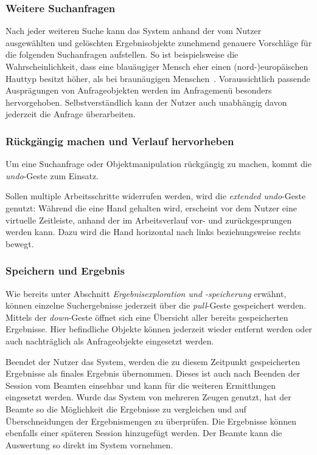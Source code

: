 \documentclass{sigchi-ext}
\begin{document}
\subsubsection{Weitere Suchanfragen}
Nach jeder weiteren Suche kann das System anhand der vom Nutzer
ausgewählten und gelöschten Ergebnisobjekte zunehmend genauere
Vorschläge für die folgenden Suchanfragen aufstellen. 
So ist beispielsweise die Wahrscheinlichkeit, dass eine blauäugiger Mensch eher einen
(nord-)europäischen Hauttyp besitzt höher, als bei braunäugigen
Menschen~\cite{eyecolor:article}. Voraussichtlich passende Ausprägungen von Anfrageobjekten werden im Anfragemenü besonders hervorgehoben. Selbstverständlich kann der Nutzer auch unabhängig davon jederzeit die Anfrage überarbeiten.

\subsubsection{Rückgängig machen und Verlauf hervorheben}
Um eine Suchanfrage oder Objektmanipulation rückgängig zu machen,
kommt die \textit{undo}-Geste zum Einsatz. 

Sollen multiple Arbeitsschritte
widerrufen werden, wird die \textit{extended undo}-Geste genutzt: 
Während die eine Hand gehalten wird, erscheint vor dem Nutzer eine virtuelle
Zeitleiste, anhand der im Arbeitsverlauf vor- und zurückgesprungen
werden kann. Dazu wird die Hand horizontal nach links beziehungsweise rechts
bewegt. 

\subsubsection{Speichern und Ergebnis}
Wie bereits unter Abschnitt \textit{Ergebnisexploration und -speicherung} erwähnt, können einzelne Suchergebnisse jederzeit über die \textit{pull}-Geste gespeichert werden. Mittels der \textit{down}-Geste öffnet sich eine Übersicht aller bereits gespeicherten Ergebnisse. Hier befindliche Objekte können jederzeit wieder entfernt werden oder auch nachträglich als Anfrageobjekte eingesetzt werden.

Beendet der Nutzer das System, werden die zu diesem Zeitpunkt gespeicherten Ergebnisse als finales Ergebnis übernommen. Dieses ist auch nach Beenden der Session vom Beamten einsehbar und kann für die weiteren Ermittlungen eingesetzt werden. Wurde das System von mehreren Zeugen genutzt, hat der Beamte so die Möglichkeit die Ergebnisse zu vergleichen und auf Überschneidungen der Ergebnismengen zu überprüfen. Die Ergebnisse können ebenfalls einer späteren Session hinzugefügt werden. Der Beamte kann die Auswertung so direkt im System vornehmen.
\end{document}
